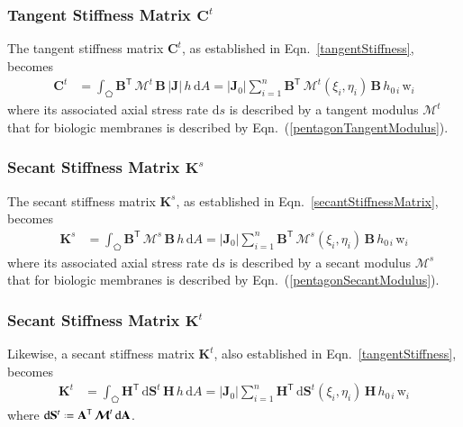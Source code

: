 \subsubsection{Tangent Stiffness Matrix $\mathbf{C}^t$}

The tangent stiffness matrix $\mathbf{C}^t$, as established in Eqn.~\eqref{tangentStiffness}, becomes 
\begin{equation}
	\begin{aligned}
		\mathbf{C}^t & =\int_{\pentagon} \mathbf{B}^{\mathsf{T}} \,  \boldsymbol{\mathcal{M}}^t \, \mathbf{B} \, |\mathbf{J}|  \, h \,  \mathrm{d} A
		= |\mathbf{J}_0| \sum_{i=1}^{n}   \mathbf{B}^{\mathsf{T}} \, \boldsymbol{\mathcal{M}}^t (\xi_i, \eta_i) \, \mathbf{B} \, h_{0\,i} \, \mathrm{w}_i 
	\end{aligned}
\end{equation} 
where its associated axial stress rate $\mathrm{d} s$ is described by a tangent modulus $\boldsymbol{\mathcal{M}}^{t}$ that for biologic membranes is described by Eqn.~(\ref{pentagonTangentModulus}).

\subsubsection{Secant Stiffness Matrix $\mathbf{K}^s$}

The secant stiffness matrix $\mathbf{K}^s$, as established in Eqn.~\eqref{secantStiffnessMatrix}, becomes
\begin{equation}
	\begin{aligned}
		\mathbf{K}^s & =\int_{\pentagon} \mathbf{B}^{\mathsf{T}} \,  \boldsymbol{\mathcal{M}}^s \, \mathbf{B}  \, h \,  \mathrm{d} A
		= |\mathbf{J}_0| \sum_{i=1}^{n}  \mathbf{B}^{\mathsf{T}} \, \boldsymbol{\mathcal{M}}^s (\xi_i, \eta_i) \, \mathbf{B} \, h_{0\,i} \, \mathrm{w}_i 
	\end{aligned}
\end{equation} 
where its associated axial stress rate $\mathrm{d} s$ is described by a secant modulus $\boldsymbol{\mathcal{M}}^{s}$ that for biologic membranes is described by Eqn.~(\ref{pentagonSecantModulus}).


\subsubsection{Secant Stiffness Matrix $\mathbf{K}^t$}

Likewise, a secant stiffness matrix $\mathbf{K}^t$, also established in Eqn.~\eqref{tangentStiffness}, becomes 
\begin{equation}
	\begin{aligned}
		\mathbf{K}^t & = \int_{\pentagon} \mathbf{H}^{\mathsf{T}} \,  \mathrm{d} \mathbf{S}^t \, \mathbf{H}  \, h \,  \mathrm{d} A
		= | \mathbf{J}_0 | \sum_{i=1}^{n}  \mathbf{H}^{\mathsf{T}} \,  \mathrm{d} \mathbf{S}^t (\xi_i, \eta_i) \, \mathbf{H} \, h_{0\,i} \, \mathrm{w}_i
	\end{aligned}
\end{equation}
where $\mathrm{d} \mathbf{S}^t \defeq \mathbf{A}^{\mathsf{T}} \, \boldsymbol{\mathcal{M}}^t \, \mathrm{d} \mathbf{A}$.

